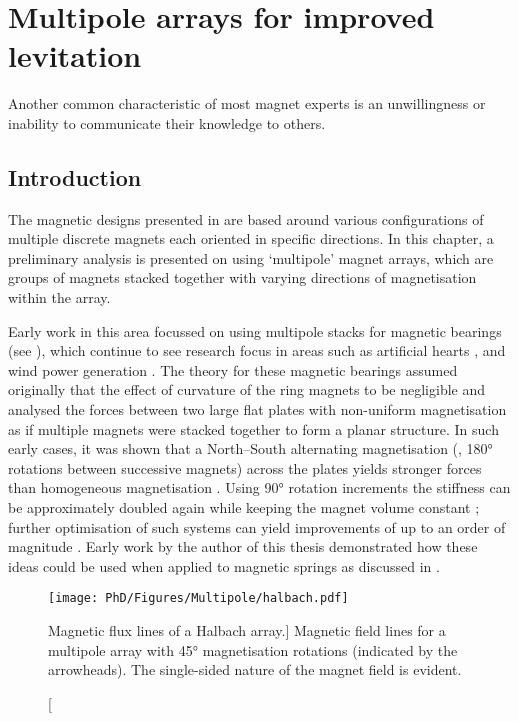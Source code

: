 \documentclass[11pt,a4paper]{memoir}
\begin{document}
\chapter{Multipole arrays for improved levitation}

\epigraph{Another common characteristic of most magnet experts is an unwillingness or inability to communicate their knowledge to others.}{\textcite{moskowitz1995}}


\section{Introduction}

The magnetic designs presented in  are based around various configurations of multiple discrete magnets each oriented in specific directions.
In this chapter, a preliminary analysis is presented on using `multipole' magnet arrays, which are groups of magnets stacked together with varying directions of magnetisation within the array.

Early work in this area focussed on using multipole stacks for magnetic bearings (see ), which continue to see research focus in areas such as artificial hearts \parencite{chen2002,finocchiaro2008,samiappan2008}, and wind power generation \parencite{liu2008-ietm}.
The theory for these magnetic bearings assumed originally that the effect of curvature of the ring magnets to be negligible and analysed the forces between two large flat plates with non-uniform magnetisation as if multiple magnets were stacked together to form a planar structure.
In such early cases, it was shown that a North--South alternating magnetisation (\ie, \ang{180} rotations between successive magnets) across the plates yields stronger forces than homogeneous magnetisation \cite{backers1961}.
Using \ang{90} rotation increments the stiffness can be approximately doubled again while keeping the magnet volume constant \cite{yonnet1991}; further optimisation of such systems can yield improvements of up to an order of magnitude \cite{moser2006}.
Early work by the author of this thesis demonstrated how these ideas could be used when applied to magnetic springs as discussed in  \cite{robertson2005-ietm}.

\begin{figure}
\texttt{[image: PhD/Figures/Multipole/halbach.pdf]}
\caption
  [Magnetic flux lines of a Halbach array.]
  {
    Magnetic field lines for a multipole array with \ang{45} magnetisation rotations (indicated by the arrowheads).
    The single-sided nature of the magnet field is evident.
  }
\end{figure}
\end{document}

